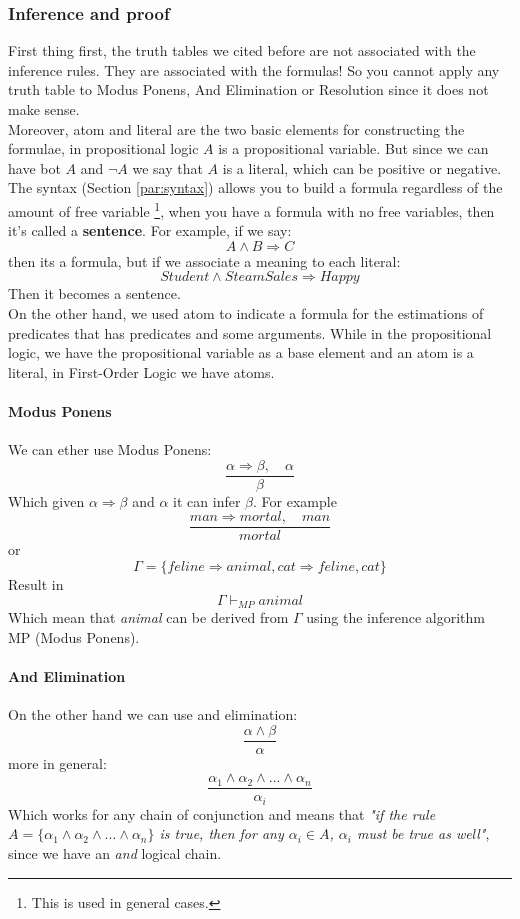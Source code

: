 \documentclass[10pt,a4paper]{article}
\begin{document}
\subsubsection{Inference and proof}
\label{subsec:modusPonens}

First thing first, the truth tables we cited before are not associated with the inference rules. They are associated with the formulas! So you cannot apply any truth table to Modus Ponens, And Elimination or Resolution since it does not make sense.\\

Moreover, atom and literal are the two basic elements for constructing the formulae, in propositional logic $A$ is a propositional variable. But since we can have bot $A$ and $\neg A$ we say that $A$ is a literal, which can be positive or negative.\\

The syntax (Section \ref{par:syntax}) allows you to build a formula regardless of the amount of free variable \footnote{This is used in general cases.}, when you have a formula with no free variables, then it's called a \textbf{sentence}. For example, if we say:
\[A\wedge B \Rightarrow C\]
then its a formula, but if we associate a meaning to each literal:
\[Student \wedge SteamSales \Rightarrow Happy\]
Then it becomes a sentence.\\

On the other hand, we used atom to indicate a formula for the estimations of predicates that has predicates and some arguments. While in the propositional logic, we have the propositional variable as a base element and an atom is a literal, in First-Order Logic we have atoms.


\paragraph{Modus Ponens} We can ether use Modus Ponens:
\[\frac{\alpha \Rightarrow \beta,\quad \alpha}{\beta}\]
Which given $\alpha \Rightarrow \beta$ and $\alpha$ it can infer $\beta$. For example
\[\frac{man \Rightarrow mortal,\quad man}{mortal}\]
or
\[\Gamma =\lbrace feline \Rightarrow animal, cat \Rightarrow feline, cat \rbrace\]
Result in 
\[\Gamma \vdash_{MP} animal\]
Which mean that \textit{animal} can be derived from $\Gamma$ using the inference algorithm MP (Modus Ponens).\\

\paragraph{And Elimination}On the other hand we can use and elimination:
\[\frac{\alpha\wedge\beta}{\alpha}\]
more in general:
\[\frac{\alpha_1\wedge\alpha_2\wedge...\wedge \alpha_n}{\alpha_i}\]
Which works for any chain of conjunction and means that \textit{"if the rule $A=\lbrace\alpha_1\wedge\alpha_2\wedge...\wedge \alpha_n\rbrace$ is true, then for any $\alpha_i \in A$, $\alpha_i$ must be true as well"}, since we have an \textit{and} logical chain.\\
\end{document}
